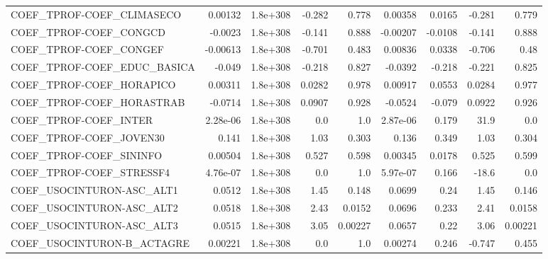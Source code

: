 \begin{tabular}{lrrrrrrrr}
COEF\_TPROF-COEF\_CLIMASECO         &     0.00132 &     1.8e+308 &  -0.282 &    0.778 &    0.00358 &      0.0165 &       -0.281 &         0.779 \\
COEF\_TPROF-COEF\_CONGCD            &     -0.0023 &     1.8e+308 &  -0.141 &    0.888 &   -0.00207 &     -0.0108 &       -0.141 &         0.888 \\
COEF\_TPROF-COEF\_CONGEF            &    -0.00613 &     1.8e+308 &  -0.701 &    0.483 &    0.00836 &      0.0338 &       -0.706 &          0.48 \\
COEF\_TPROF-COEF\_EDUC\_BASICA       &      -0.049 &     1.8e+308 &  -0.218 &    0.827 &    -0.0392 &      -0.218 &       -0.221 &         0.825 \\
COEF\_TPROF-COEF\_HORAPICO          &     0.00311 &     1.8e+308 &  0.0282 &    0.978 &    0.00917 &      0.0553 &       0.0284 &         0.977 \\
COEF\_TPROF-COEF\_HORASTRAB         &     -0.0714 &     1.8e+308 &  0.0907 &    0.928 &    -0.0524 &      -0.079 &       0.0922 &         0.926 \\
COEF\_TPROF-COEF\_INTER             &    2.28e-06 &     1.8e+308 &     0.0 &      1.0 &   2.87e-06 &       0.179 &         31.9 &           0.0 \\
COEF\_TPROF-COEF\_JOVEN30           &       0.141 &     1.8e+308 &    1.03 &    0.303 &      0.136 &       0.349 &         1.03 &         0.304 \\
COEF\_TPROF-COEF\_SININFO           &     0.00504 &     1.8e+308 &   0.527 &    0.598 &    0.00345 &      0.0178 &        0.525 &         0.599 \\
COEF\_TPROF-COEF\_STRESSF4          &    4.76e-07 &     1.8e+308 &     0.0 &      1.0 &   5.97e-07 &       0.166 &        -18.6 &           0.0 \\
COEF\_USOCINTURON-ASC\_ALT1         &      0.0512 &     1.8e+308 &    1.45 &    0.148 &     0.0699 &        0.24 &         1.45 &         0.146 \\
COEF\_USOCINTURON-ASC\_ALT2         &      0.0518 &     1.8e+308 &    2.43 &   0.0152 &     0.0696 &       0.233 &         2.41 &        0.0158 \\
COEF\_USOCINTURON-ASC\_ALT3         &      0.0515 &     1.8e+308 &    3.05 &  0.00227 &     0.0657 &        0.22 &         3.06 &       0.00221 \\
COEF\_USOCINTURON-B\_ACTAGRE        &     0.00221 &     1.8e+308 &     0.0 &      1.0 &    0.00274 &       0.246 &       -0.747 &         0.455 \\

\end{tabular}
